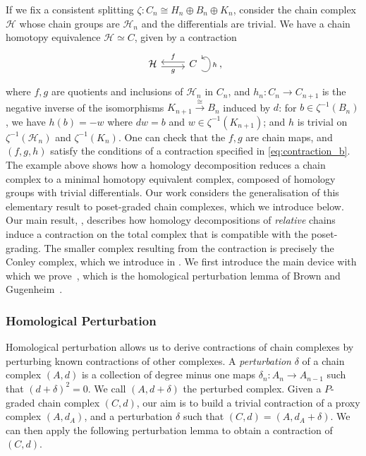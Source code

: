 \documentclass[11pt, table, nothms]{amsart}
\theoremstyle{definition}
\newcommand{\cH}{\mathcal{H}}
\begin{document}
{    If we fix a consistent splitting $\zeta: C_n \cong H_n \oplus B_n \oplus K_n$, consider the chain complex $\cH$ whose chain groups are $\cH_n$ and the differentials are trivial. We have a chain homotopy equivalence $\cH \simeq C$, given by a contraction 
    \[
    \begin{tikzcd}
	\cH & C
	\arrow["g"', shift right, from=1-1, to=1-2]
	\arrow["f"', shift right, from=1-2, to=1-1]
	\arrow["h"', from=1-2, to=1-2, loop, in=35, out=325, distance=5mm]
\end{tikzcd},
    \]
    where $f,g$ are quotients and inclusions of $\cH_n$ in $C_n$, and $h_n: C_n \to C_{n+1}$ is the negative inverse of the isomorphisms $K_{n+1} \xrightarrow{\cong} B_{n}$ induced by $d$: for $ b \in \zeta^{-1}(B_{n})$, {we have $h(b) = -w$ where $dw = b$ and $w \in \zeta^{-1}(K_{n+1})$;} and $h$ is trivial on $\zeta^{-1}(\cH_n)$ and $\zeta^{-1}(K_n)$. One can check that the $f,g$ are chain maps, and $(f,g,h)$ satisfy the conditions of a contraction specified in \cref{eq:contraction_b}.
    \fi 
The example above shows how a homology decomposition reduces a chain complex to a minimal homotopy equivalent complex, composed of homology groups with trivial differentials. 
Our work considers the generalisation of this elementary result to poset-graded chain complexes, which we introduce below. 
Our main result, , describes how homology decompositions of \emph{relative} chains induce a contraction on the total complex that is compatible with the poset-grading. 
The smaller complex resulting from the contraction is  precisely the Conley complex, which we introduce in . We first introduce the main device with which we prove~, which is the homological perturbation lemma of Brown and Gugenheim~\cite{Brown1965TheTheorem, Gugenheim1972OnFibration}. 


\subsubsection{Homological Perturbation}\label{ssec:homological_perturbation}
Homological perturbation allows us to derive contractions of chain complexes by perturbing known contractions of other complexes. 
A \emph{perturbation} $\delta$ of a chain complex $(A, d)$ is a collection of degree minus one maps $\delta_n: A_n \to A_{n - 1}$ such that $(d+\delta)^2 = 0$. We call $(A, d + \delta)$ the perturbed complex. Given a $P$-graded chain complex $(C,d)$, our aim is to build a trivial contraction of a proxy complex $(A,d_A)$, and a perturbation $\delta$ such that $(C, d) = (A, d_A + \delta)$. We can then apply the following perturbation lemma to obtain a contraction of $(C,d)$.

}
\end{document}
